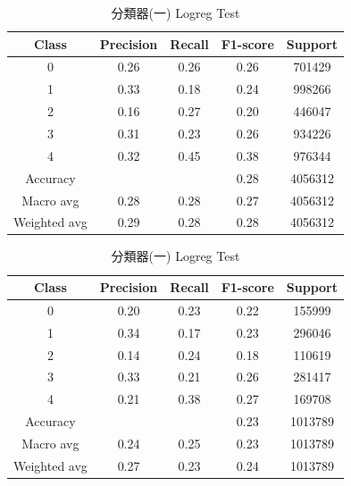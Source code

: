 \begin{enumerate}
        \begin{table}[H]
        \centering
        \scriptsize
        \begin{minipage}{0.48\textwidth}
        \centering
        \begin{tabular}{c|cccc}
        \hline
        Class & Precision & Recall & F1-score & Support \\
        \hline
        0 & 0.26 & 0.26 & 0.26 & 701429 \\
        1 & 0.33 & 0.18 & 0.24 & 998266 \\
        2 & 0.16 & 0.27 & 0.20 & 446047 \\
        3 & 0.31 & 0.23 & 0.26 & 934226 \\
        4 & 0.32 & 0.45 & 0.38 & 976344 \\
        \hline
        Accuracy &       &      & 0.28 & 4056312 \\
        Macro avg & 0.28 & 0.28 & 0.27 & 4056312 \\
        Weighted avg & 0.29 & 0.28 & 0.28 & 4056312 \\
        \hline
        \end{tabular}
        \caption{分類器(一) Logreg Train}
        \label{tab:classifier_1_report_train_logreg_non_filtered}
        \end{minipage}%
        \hfill
        \begin{minipage}{0.48\textwidth}
        \centering
        \begin{tabular}{c|cccc}
        \hline
        Class & Precision & Recall & F1-score & Support \\
        \hline
        0 & 0.20 & 0.23 & 0.22 & 155999 \\
        1 & 0.34 & 0.17 & 0.23 & 296046 \\
        2 & 0.14 & 0.24 & 0.18 & 110619 \\
        3 & 0.33 & 0.21 & 0.26 & 281417 \\
        4 & 0.21 & 0.38 & 0.27 & 169708 \\
        \hline
        Accuracy &       &      & 0.23 & 1013789 \\
        Macro avg & 0.24 & 0.25 & 0.23 & 1013789 \\
        Weighted avg & 0.27 & 0.23 & 0.24 & 1013789 \\
        \hline
        \end{tabular}
        \caption{分類器(一) Logreg Test}
        \label{tab:classifier_1_report_test_logreg_non_filtered}
        \end{minipage}
        \end{table}


\end{enumerate}

